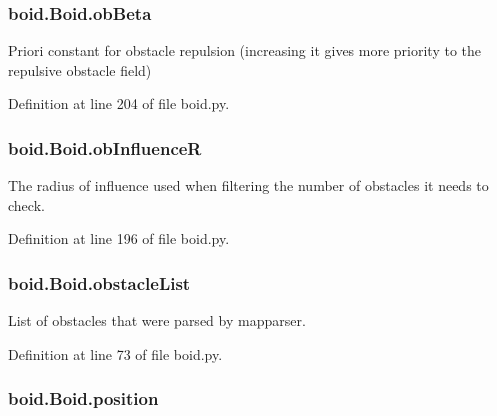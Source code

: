 \hypertarget{classboid_1_1Boid_a222ad56335a1e1ea39dd6da9e21797c5}{
\subsubsection[{ob\-Beta}]{\setlength{\rightskip}{0pt plus 5cm}boid.\-Boid.\-ob\-Beta}}\label{classboid_1_1Boid_a222ad56335a1e1ea39dd6da9e21797c5}


Priori constant for obstacle repulsion (increasing it gives more priority to the repulsive obstacle field) 



Definition at line 204 of file boid.\-py.

\hypertarget{classboid_1_1Boid_abc5327f9ad46170e5f57d89c2c6e18e9}{
\subsubsection[{ob\-Influence\-R}]{\setlength{\rightskip}{0pt plus 5cm}boid.\-Boid.\-ob\-Influence\-R}}\label{classboid_1_1Boid_abc5327f9ad46170e5f57d89c2c6e18e9}


The radius of influence used when filtering the number of obstacles it needs to check. 



Definition at line 196 of file boid.\-py.

\hypertarget{classboid_1_1Boid_a9db9b88d02af40d3773b034560959694}{
\subsubsection[{obstacle\-List}]{\setlength{\rightskip}{0pt plus 5cm}boid.\-Boid.\-obstacle\-List}}\label{classboid_1_1Boid_a9db9b88d02af40d3773b034560959694}


List of obstacles that were parsed by mapparser. 



Definition at line 73 of file boid.\-py.

\hypertarget{classboid_1_1Boid_a483cb30093bc500a6123d5a801247ad5}{
\subsubsection[{position}]{\setlength{\rightskip}{0pt plus 5cm}boid.\-Boid.\-position}}\label{classboid_1_1Boid_a483cb30093bc500a6123d5a801247ad5}


